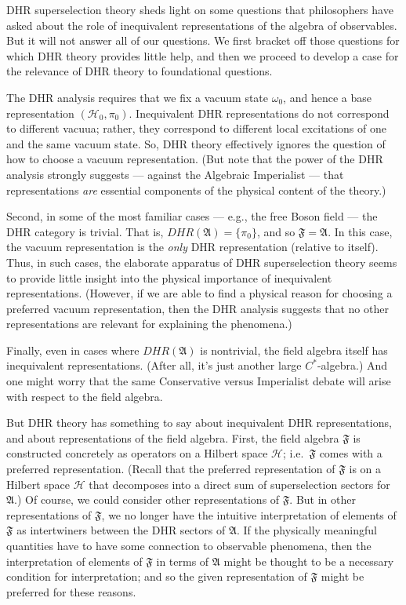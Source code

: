 \documentclass[11pt]{article}
\theoremstyle{definition}
\theoremstyle{definition}
\theoremstyle{remark}
\def\2#1{{\mathcal #1}}
\def\al#1{{\mathfrak #1}}
\def\om{\omega} \def\Om{\Omega} \def\dd{\partial} \def\D{\Delta}
\begin{document}
DHR superselection theory sheds light on some questions that
philosophers have asked about the role of inequivalent representations
of the algebra of observables.  But it will not answer all of our
questions.  We first bracket off those questions for which DHR theory
provides little help, and then we proceed to develop a case for the
relevance of DHR theory to foundational questions.

The DHR analysis requires that we fix a vacuum state $\om _0$, and
hence a base representation $(\2H_0 ,\pi _0)$.  Inequivalent DHR
representations do not correspond to different vacuua; rather, they
correspond to different local excitations of one and the same vacuum
state.  So, DHR theory effectively ignores the question of how to
choose a vacuum representation.  (But note that the power of the DHR
analysis strongly suggests --- against the Algebraic Imperialist ---
that representations \emph{are} essential components of the physical
content of the theory.)

Second, in some of the most familiar cases --- e.g., the free Boson
field --- the DHR category is trivial.  That is, $DHR(\al A)=\{ \pi _0
\}$, and so $\al F=\al A$.  In this case, the vacuum representation is
the \emph{only} DHR representation (relative to itself).  Thus, in
such cases, the elaborate apparatus of DHR superselection theory seems
to provide little insight into the physical importance of inequivalent
representations.  (However, if we are able to find a physical reason
for choosing a preferred vacuum representation, then the DHR analysis
suggests that no other representations are relevant for explaining the
phenomena.)

Finally, even in cases where $DHR(\al A)$ is nontrivial, the field
algebra itself has inequivalent representations.  (After all, it's
just another large $C^*$-algebra.)  And one might worry that the same
Conservative versus Imperialist debate will arise with respect to the
field algebra.  

But DHR theory has something to say about inequivalent DHR
representations, and about representations of the field algebra.
First, the field algebra $\al F$ is constructed concretely as
operators on a Hilbert space $\2H$; i.e.\ $\al F$ comes with a
preferred representation.  (Recall that the preferred representation
of $\al F$ is on a Hilbert space $\2H$ that decomposes into a direct
sum of superselection sectors for $\al A$.)  Of course, we could
consider other representations of $\al F$.  But in other
representations of $\al F$, we no longer have the intuitive
interpretation of elements of $\al F$ as intertwiners between the DHR
sectors of $\al A$.  If the physically meaningful quantities have to
have some connection to observable phenomena, then the interpretation
of elements of $\al F$ in terms of $\al A$ might be thought to be a
necessary condition for interpretation; and so the given
representation of $\al F$ might be preferred for these reasons.
\end{document}
